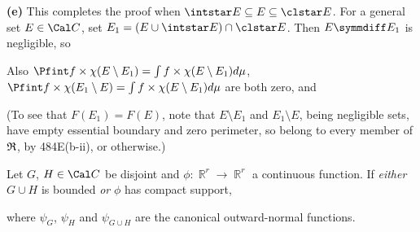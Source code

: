 {\medskip

{\bf (e)} This completes the proof when
$\intstar E\subseteq E\subseteq\clstar E$.   For a general set
$E\in\Cal C$, set $E_1=(E\cup\intstar E)\cap\clstar E$.   Then
$E\symmdiff E_1$ is negligible, so


\noindent Also $\Pfint f\times\chi(E\setminus E_1)
=\int f\times\chi(E\setminus E_1)d\mu$,
$\Pfint f\times\chi(E_1\setminus E)
=\int f\times\chi(E\setminus E_1)d\mu$ are both zero, and


\noindent (To see that $F(E_1)=F(E)$, note that $E\setminus E_1$ and
$E_1\setminus E$, being negligible sets, have empty essential boundary
and zero perimeter, so belong to every member of $\frak R$, by
484E(b-ii), or otherwise.)
}%

 Let $G$, $H\in\Cal C$ be disjoint and
$\phi:\BbbR^r\to\BbbR^r$ a continuous function.   If {\it either}
$G\cup H$ is bounded {\it or} $\phi$ has compact support,


\noindent where $\psi_G$, $\psi_H$ and $\psi_{G\cup H}$ are the
canonical outward-normal functions.

